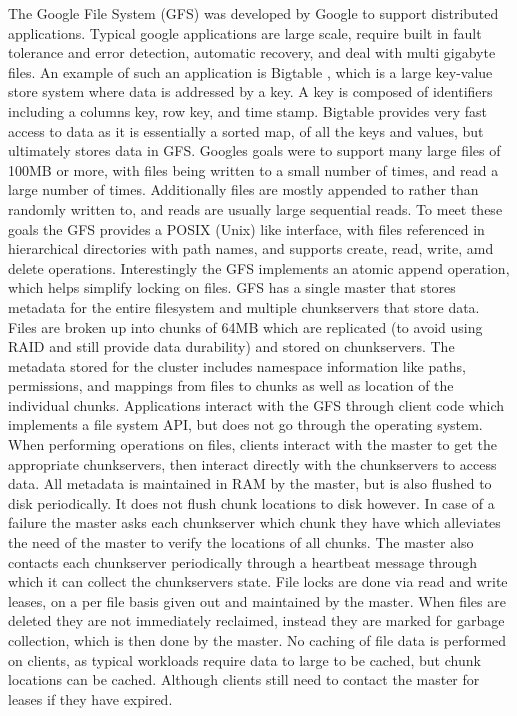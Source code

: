 The Google File System (GFS) \cite{Ghemawat2003} was developed by Google to
support distributed applications. Typical google applications are large scale,
require built in fault tolerance and error detection, automatic recovery, and
deal with multi gigabyte files. An example of such an application is Bigtable
\cite{Chang2008}, which is a large key-value store system where data is
addressed by a key. A key is composed of identifiers including a columns key,
row key, and time stamp. Bigtable provides very fast access to data as it is
essentially a sorted map, of all the keys and values, but ultimately stores
data in GFS. Googles goals were to support many large files of 100MB or more,
with files being written to a small number of times, and read a large number
of times. Additionally files are mostly appended to rather than randomly
written to, and reads are usually large sequential reads. To meet these goals
the GFS provides a POSIX (Unix) like interface, with files referenced in
hierarchical directories with path names, and supports create, read, write,
amd delete operations. Interestingly the GFS implements an atomic append
operation, which helps simplify locking on files. GFS has a single master that
stores metadata for the entire filesystem and multiple chunkservers that store
data. Files are broken up into chunks of 64MB which are replicated (to avoid
using RAID and still provide data durability) and stored on chunkservers. The
metadata stored for the cluster includes namespace information like paths,
permissions, and mappings from files to chunks as well as location of the
individual chunks. Applications interact with the GFS through client code
which implements a file system API, but does not go through the operating
system. When performing operations on files, clients interact with the master
to get the appropriate chunkservers, then interact directly with the
chunkservers to access data. All metadata is maintained in RAM by the master,
but is also flushed to disk periodically. It does not flush chunk locations to
disk however. In case of a failure the master asks each chunkserver which
chunk they have which alleviates the need of the master to verify the
locations of all chunks. The master also contacts each chunkserver
periodically through a heartbeat message through which it can collect the
chunkservers state. File locks are done via read and write leases, on a per
file basis given out and maintained by the master. When files are deleted they
are not immediately reclaimed, instead they are marked for garbage collection,
which is then done by the master. No caching of file data is performed on
clients, as typical workloads require data to large to be cached, but chunk
locations can be cached. Although clients still need to contact the master for
leases if they have expired.


